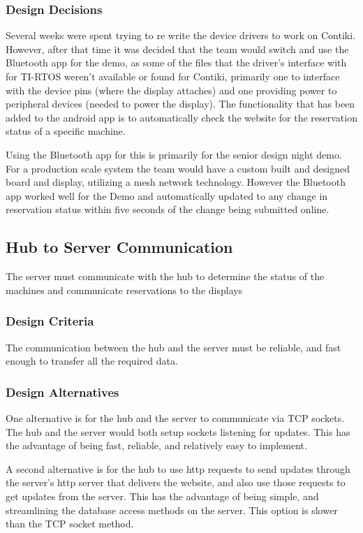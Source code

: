 \documentclass[PPFS.tex]{template/subfiles}
\begin{document}
\subsubsection{Design Decisions}
Several weeks were spent trying to re write the device drivers to work on Contiki. However, after that time it was decided that the team would switch and use the Bluetooth app for the demo, as some of the files that the driver's interface with for TI-RTOS weren't available or found for Contiki, primarily one to interface with the device pins (where the display attaches) and one providing power to peripheral devices (needed to power the display). The functionality that has been added to the android app is to automatically check the website for the reservation status of a specific machine. 

Using the Bluetooth app for this is primarily for the senior design night demo. For a production scale system the team would have a custom built and designed board and display, utilizing a mesh network technology. However the Bluetooth app worked well for the Demo and automatically updated to any change in reservation status within five seconds of the change being submitted online. 

\subsection{Hub to Server Communication}
The server must communicate with the hub to determine the status of the machines and communicate reservations to the displays

\subsubsection{Design Criteria}
The communication between the hub and the server must be reliable, and fast enough to transfer all the required data.

\subsubsection{Design Alternatives}
One alternative is for the hub and the server to communicate via TCP sockets. The hub and the server would both setup sockets listening for updates. This has the advantage of being fast, reliable, and relatively easy to implement.

A second alternative is for the hub to use http requests to send updates through the server's http server that delivers the website, and also use those requests to get updates from the server. This has the advantage of being simple, and streamlining the database access methods on the server. This option is slower than the TCP socket method.
\end{document}
